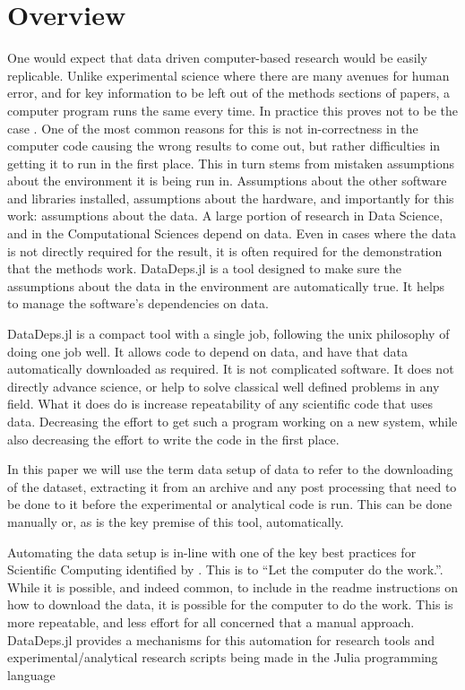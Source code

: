 \documentclass{jors}
\begin{document}
\section{Overview}


One would expect that data driven computer-based research would be easily replicable.
Unlike experimental science where there are many avenues for human error, and for key information to be left out of the methods sections of papers, a computer program runs the same every time.
In practice this proves not to be the case .
One of the most common reasons for this is not in-correctness in the computer code causing the wrong results to come out,
but rather difficulties in getting it to run in the first place.
This in turn stems from mistaken assumptions about the environment it is being run in.
Assumptions about the other software and libraries installed, assumptions about the hardware,
and importantly for this work: assumptions about the data.
A large portion of research in Data Science, and in the Computational Sciences depend on data.
Even in cases where the data is not directly required for the result, it is often required for the demonstration that the methods work.
DataDeps.jl is a tool designed to make sure the assumptions about the data in the environment are automatically true.
It helps to manage the software's dependencies on data.



DataDeps.jl is a compact tool with a single job, following the unix philosophy of doing one job well.
It allows code to depend on data, and have that data automatically downloaded as required.
It is not complicated software.
It does not directly advance science, or help to solve classical well defined problems in any field.
What it does do is increase repeatability of any scientific code that uses data.
Decreasing the effort to get such a program working on a new system, while also decreasing the effort to write the code in the first place.


In this paper we will use the term data setup of data to refer to the downloading of the dataset, extracting it from an archive and any post processing that need to be done to it before the experimental or analytical code is run.
This can be done manually or, as is the key premise of this tool, automatically.


Automating the data setup is in-line with one of the key best practices for Scientific Computing identified by \textcite{10.1371/journal.pbio.1001745}.
This is to ``Let the computer do the work.''.
While it is possible, and indeed common, to include in the readme instructions on how to download the data, it is possible for the computer to do the work.
This is more repeatable, and less effort for all concerned that a manual approach.
DataDeps.jl provides a mechanisms for this automation for research tools and experimental/analytical research scripts being made in the Julia programming language 
\end{document}

